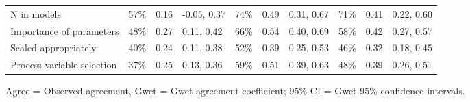 \begin{table}[H]
\begin{widestuff}
\begin{flushleft}
\begin{tabular}{llllllllll}
  N in models & 57\% & 0.16 & -0.05, 0.37 & 74\% & 0.49 & 0.31, 0.67 & 71\% & 0.41 & 0.22, 0.60 \\ 
  Importance of parameters & 48\% & 0.27 & 0.11, 0.42 & 66\% & 0.54 & 0.40, 0.69 & 58\% & 0.42 & 0.27, 0.57 \\ 
  Scaled appropriately & 40\% & 0.24 & 0.11, 0.38 & 52\% & 0.39 & 0.25, 0.53 & 46\% & 0.32 & 0.18, 0.45 \\ 
  Process variable selection & 37\% & 0.25 & 0.13, 0.36 & 59\% & 0.51 & 0.39, 0.63 & 48\% & 0.39 & 0.26, 0.51 \\ 
   \bottomrule
\end{tabular} \end{flushleft} \begin{flushleft}  Agree = Observed agreement, Gwet = Gwet agreement coefficient; 95\% CI = Gwet 95\% confidence intervals. \end{flushleft}
\end{widestuff}
\end{table}

